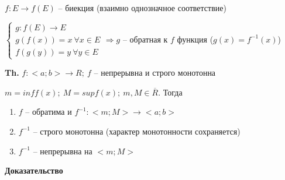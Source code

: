 \documentclass[14pt, letter paper]{article}
\begin{document}
$f : E \rightarrow f(E)$ -- биекция (взаимно однозначное соответствие)

$\begin{cases}
    g : f(E) \rightarrow E \\
    g(f(x)) = x\ \forall x \in E \\
    f(g(y)) = y\ \forall y \in E
\end{cases} \Rightarrow g$ -- обратная к $f$ функция ($g(x) = f^{-1}(x)$)

\textbf{Th.} $f : <a; b> \rightarrow R;\ f$ -- непрерывна и строго монотонна

$m = inff(x);\ M = supf(x);\ m, M \in \overline{R}$. Тогда

\begin{enumerate}
    \item $f$ -- обратима и $f^{-1} : <m;M> \rightarrow <a;b>$
    \item $f^{-1}$ -- строго монотонна (характер монотонности сохраняется)
    \item $f^{-1}$ -- непрерывна на $<m;M>$
\end{enumerate}

\begin{center}
    \textbf{Доказательство}
\end{center}
\end{document}
